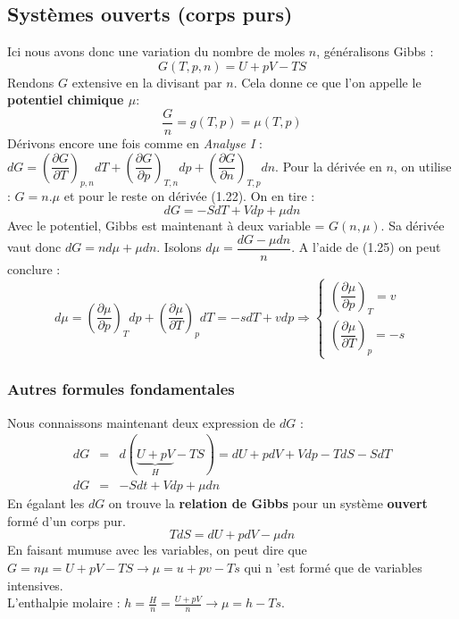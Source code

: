 \documentclass[british,french,11pt, a4paper, openany]{book}
\begin{document}
	\subsection{Systèmes ouverts (corps purs)}
	Ici nous avons donc une variation du nombre de moles $n$, généralisons Gibbs :
	\begin{equation}
	G(T,p,n) = U + pV - TS
	\end{equation}
	Rendons $G$ extensive en la divisant par $n$. Cela donne ce que l'on appelle le \textbf{potentiel chimique $\mu$}:
	\begin{equation}
	\frac{G}{n} = g(T, p) = \mu(T,p)
	\end{equation}
	Dérivons encore une fois comme en \textit{Analyse I} :\\
	$dG = \left(\dfrac{\partial G}{\partial T}\right)_{p,n} dT + \left(\dfrac{\partial G}{\partial p}\right)_{T,n} dp +  \left(\dfrac{\partial G}{\partial n}\right)_{T,p}dn$. Pour la dérivée en $n$, on utilise : $G = n.\mu$ et pour le reste on dérivée (1.22). On en tire :
	\begin{equation}
	dG = -SdT + Vdp + \mu dn
	\end{equation}
	Avec le potentiel, Gibbs est maintenant à deux variable = $G(n,\mu)$. Sa dérivée vaut donc $dG = nd\mu + \mu dn$. Isolons $d\mu = \dfrac{dG - \mu dn}{n}$. A l'aide de (1.25) on peut conclure :
	\begin{equation}
	d\mu =\left(\frac{\partial\mu}{\partial p}\right)_Tdp+\left(\frac{\partial\mu}{\partial T}\right)_pdT= -sdT + vdp\Rightarrow\left\{\begin{array}{l}
	\left(\dfrac{\partial \mu}{\partial p}\right)_T = v\\
	\left(\dfrac{\partial \mu}{\partial T}\right)_p = -s
	\end{array}\right.
	\end{equation}
	\subsubsection{Autres formules fondamentales}
	Nous connaissons maintenant deux expression de $dG$ :
	\begin{eqnarray}
	dG &=& d(\underbrace{U + pV}_H - TS) = dU + pdV + Vdp - TdS - SdT\\
	dG &=& -Sdt + Vdp + \mu dn
	\end{eqnarray}
	En égalant les $dG$ on trouve la \textbf{relation de Gibbs} pour un système \textbf{ouvert} formé d'un corps pur.
	\begin{equation}
	TdS = dU + pdV - \mu dn
	\end{equation}
	En faisant mumuse avec les variables, on peut dire que $G = n\mu = U + pV - TS \rightarrow \mu = u + pv - Ts$ qui n 'est formé que de variables intensives.\\
	L'enthalpie molaire : $h = \frac{H}{n} = \frac{U + pV}{n} \rightarrow \mu = h - Ts$.
	
\end{document}
